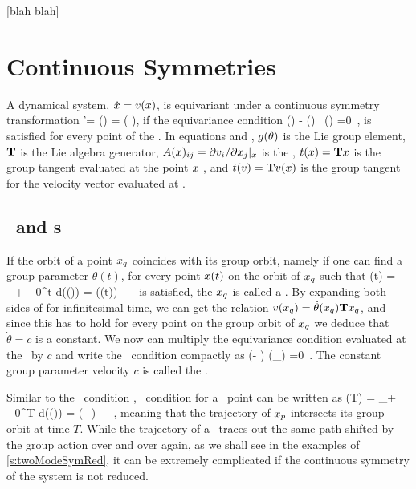 \documentclass[aip,cha,
reprint,
secnumarabic,
nofootinbib, tightenlines,
nobibnotes, showkeys, showpacs,
groupedaddress,
]{revtex4-1}
\begin{document}
 [blah blah]

\section{Continuous Symmetries}
\label{s:symm}

A dynamical system, $\dot{x}=v(x)$, is equivariant under a continuous
symmetry transformation
\beq
	\ssp'= \LieEl (\theta) \ssp = \exp\left( \theta \Lg\right)\ssp,
if the equivariance condition 
\beq
  \groupTan(\vel)  - \Mvar(\ssp) \, \groupTan(\ssp) =0
  \,,
is satisfied for every point of the \statesp . In equations  and ,
$g (\theta)$ is the Lie group element, $\mathbf{T}$ is the Lie algebra generator,
$A(x)_{ij} = {\partial v_i}/{\partial x_j} |_x$  is the \stabmat ,
$ t(x) = \mathbf{T} x $ is the group tangent evaluated at the point $x$ ,
and $ t(v) = \mathbf{T} v(x) $ is the group tangent for the velocity
vector evaluated at \ssp .

\subsection{\Reqva\ and \rpo s}
\label{s:relatives}

If the orbit of a point $x_q$ coincides with its group orbit,
namely if one can find a group parameter $\theta (t)$, for every point $x (t)$
on the orbit of $x_q$ such that
\beq
  \ssp (t) = \ssp_\stagn + \int_0^t d\tau \vel(\ssp (\tau)) = \LieEl (\theta (t)) \ssp_\stagn
  \,
is satisfied, the $x_q$ is called a \reqv . By expanding both sides of 
for infinitesimal time, we can get the relation $v(x_q) = \dot{\theta}(x_q) \mathbf{T} x_q$,
and since this has to hold for every point on the group orbit of $x_q$
we deduce that $\dot{\theta} = c$ is a constant. We now can multiply the equivariance
condition  evaluated at the \reqv\ by $c$ and write the
\reqv\ condition compactly as
\beq
(\velRel \Lg - \Mvar ) \vel (\ssp_\stagn) =0
\,.
The constant group parameter velocity $c$  is called the \phaseVel .

Similar to the \reqv\ condition , \rpo\ condition for a \statesp\ point can be written as
\beq
  \ssp (T) = \ssp_\rpprime  + \int_0^T d\tau \vel(\ssp (\tau)) = \LieEl (\theta_\rpprime ) \ssp_\rpprime
  \,,
meaning that the trajectory of $x_{\tilde{p}}$ intersects its group orbit at
time $T$. While the trajectory of a \rpo\ traces out the same path shifted
by the group action over and over again, as we shall see in the examples of
\ref{s:twoModeSymRed}, it can be extremely complicated if the continuous
symmetry of the system is not reduced.
\end{document}
